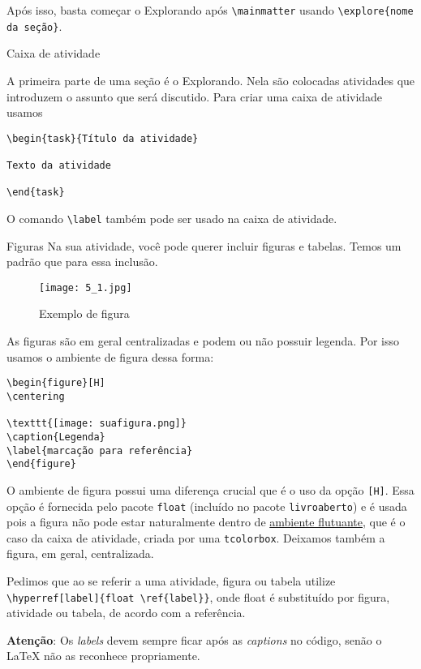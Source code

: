 Após isso, basta começar o Explorando após \verb|\mainmatter| usando \verb|\explore{nome da seção}|.

\begin{task}{Caixa de atividade}

A primeira parte de uma seção é o Explorando. Nela são colocadas atividades que introduzem o assunto que será discutido. Para criar uma caixa de atividade usamos
\begin{verbatim}
\begin{task}{Título da atividade}

Texto da atividade

\end{task}
\end{verbatim} 

O comando \verb|\label| também pode ser usado na caixa de atividade.
\end{task}


\begin{task}{Figuras}
Na sua atividade, você pode querer incluir figuras e tabelas. Temos um padrão que para essa inclusão.

\begin{figure}[H]
\centering

\texttt{[image: 5\_1.jpg]}
\caption{Exemplo de figura}
\end{figure}

As figuras são em geral centralizadas e podem ou não possuir legenda. Por isso usamos o ambiente de figura dessa forma:

\begin{verbatim}
\begin{figure}[H]
\centering

\texttt{[image: suafigura.png]}
\caption{Legenda}
\label{marcação para referência}
\end{figure}
\end{verbatim}

O ambiente de figura possui uma diferença crucial que é o uso da opção \verb|[H]|. Essa opção é fornecida pelo pacote \verb|float| (incluído no pacote \verb|livroaberto|) e é usada pois a figura não pode estar naturalmente dentro de \href{https://en.wikibooks.org/wiki/LaTeX/Floats,_Figures_and_Captions}{ambiente flutuante}, que é o caso da caixa de atividade, criada por uma \verb|tcolorbox|. Deixamos também a figura, em geral, centralizada.

Pedimos que ao se referir a uma atividade, figura ou tabela utilize \verb|\hyperref[label]{float \ref{label}}|, onde float é substituído por figura, atividade ou tabela, de acordo com a referência. 

\textbf{Atenção}: Os \textit{labels} devem sempre ficar após as \textit{captions} no código, senão o \LaTeX{} não as reconhece propriamente.
\end{task}

